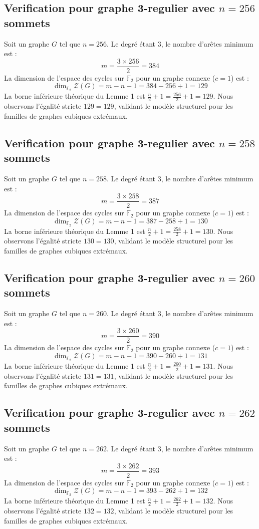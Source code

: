 \documentclass[11pt,a4paper]{article}
\begin{document}
\subsection{Verification pour graphe 3-regulier avec $n=256$ sommets}
Soit un graphe $G$ tel que $n = 256$. Le degré étant 3, le nombre d'arêtes minimum est :
$$ m = \frac{3 \times 256}{2} = 384 $$
La dimension de l'espace des cycles sur $\mathbb{F}_2$ pour un graphe connexe ($c=1$) est :
$$ \dim_{\mathbb{F}_2} \mathcal{Z}(G) = m - n + 1 = 384 - 256 + 1 = 129 $$
La borne inférieure théorique du Lemme 1 est $\frac{n}{2} + 1 = \frac{256}{2} + 1 = 129$.
Nous observons l'égalité stricte $129 = 129$, validant le modèle structurel pour les familles de graphes cubiques extrémaux.

\subsection{Verification pour graphe 3-regulier avec $n=258$ sommets}
Soit un graphe $G$ tel que $n = 258$. Le degré étant 3, le nombre d'arêtes minimum est :
$$ m = \frac{3 \times 258}{2} = 387 $$
La dimension de l'espace des cycles sur $\mathbb{F}_2$ pour un graphe connexe ($c=1$) est :
$$ \dim_{\mathbb{F}_2} \mathcal{Z}(G) = m - n + 1 = 387 - 258 + 1 = 130 $$
La borne inférieure théorique du Lemme 1 est $\frac{n}{2} + 1 = \frac{258}{2} + 1 = 130$.
Nous observons l'égalité stricte $130 = 130$, validant le modèle structurel pour les familles de graphes cubiques extrémaux.

\subsection{Verification pour graphe 3-regulier avec $n=260$ sommets}
Soit un graphe $G$ tel que $n = 260$. Le degré étant 3, le nombre d'arêtes minimum est :
$$ m = \frac{3 \times 260}{2} = 390 $$
La dimension de l'espace des cycles sur $\mathbb{F}_2$ pour un graphe connexe ($c=1$) est :
$$ \dim_{\mathbb{F}_2} \mathcal{Z}(G) = m - n + 1 = 390 - 260 + 1 = 131 $$
La borne inférieure théorique du Lemme 1 est $\frac{n}{2} + 1 = \frac{260}{2} + 1 = 131$.
Nous observons l'égalité stricte $131 = 131$, validant le modèle structurel pour les familles de graphes cubiques extrémaux.

\subsection{Verification pour graphe 3-regulier avec $n=262$ sommets}
Soit un graphe $G$ tel que $n = 262$. Le degré étant 3, le nombre d'arêtes minimum est :
$$ m = \frac{3 \times 262}{2} = 393 $$
La dimension de l'espace des cycles sur $\mathbb{F}_2$ pour un graphe connexe ($c=1$) est :
$$ \dim_{\mathbb{F}_2} \mathcal{Z}(G) = m - n + 1 = 393 - 262 + 1 = 132 $$
La borne inférieure théorique du Lemme 1 est $\frac{n}{2} + 1 = \frac{262}{2} + 1 = 132$.
Nous observons l'égalité stricte $132 = 132$, validant le modèle structurel pour les familles de graphes cubiques extrémaux.
\end{document}
